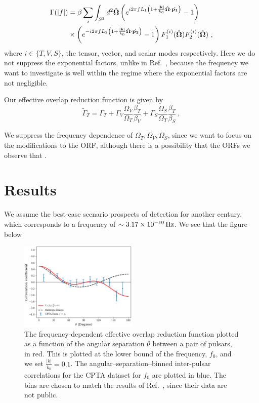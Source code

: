 \documentclass[prd,aps,psfig,nofootinbib,nobibnotes,superscriptaddress,preprintnumbers,times]{revtex4-2}\setlength{\topmargin}{-14mm}
\newcommand{\Hz}{\,{\rm Hz}}
\begin{document}
\begin{equation}
  \begin{aligned}\label{eq:orf_full}
    \Gamma(|f|) &= \beta \sum_i \int_{S^2} d^2 \hat{\bf{\Omega}} \left( e^{i2\pi f L_1\left(1 + \frac{|\bf k|}{k_0}\hat{\bf{\Omega}}\cdot \hat{\bf p_1} \right)} - 1\right) \\ &\times  \left( e^{-i2\pi f L_2\left(1 + \frac{|\bf k|}{k_0}\hat{\bf{\Omega}}\cdot \hat{\bf p_2} \right)} - 1\right) F_1^{(i)}(\hat{\bf{\Omega}}) F_2^{(i)}(\hat{\bf{\Omega}}) \ ,
  \end{aligned}\end{equation}
where $i \in \{T,V,S\}$, the tensor, vector, and scalar modes respectively. Here we do not suppress the exponential factors, unlike in Ref.\ \cite{Liang:2021bct}, because the frequency we want to investigate is well within the regime where the exponential factors are not negligible. 

Our effective overlap reduction function is given by \cite{Liang:2021bct}
\begin{equation}\label{eq:eff_orf}
    \tilde{\Gamma}_{T} = \Gamma_{T} + \Gamma_{V} \frac{\Omega_V}{\Omega_T}\frac{\beta_T}{\beta_V} + \Gamma_{S} \frac{\Omega_S}{\Omega_T}\frac{\beta_T}{\beta_S} \ ,
\end{equation}

We suppress the frequency dependence of $\Omega_T, \Omega_V, \Omega_S$, since we want to focus on the modifications to the ORF, although there is a possibility that the ORFs we observe that \cite{Xu:2023wog}. 
\section{Results}\label{sec:results}
We assume the best-case scenario prospects of detection for another century, which corresponds to a frequency of $\sim 3.17 \times 10^{-10} \Hz$. 
We see that the figure below
\begin{figure}[h]
    \centering
    \includegraphics[width=0.5\textwidth]{fig0.pdf}
    \caption{The frequency-dependent effective overlap reduction function plotted as a function of the angular separation $\theta$ between a pair of pulsars, in red. This is plotted at the lower bound of the frequency, $f_0$, and we set $\frac{|k|}{k_0} = 0.1$. The angular–separation–binned inter-pulsar correlations for the CPTA dataset for $f_0$ are plotted in blue. The bins are chosen to match the results of Ref.\ \cite{Xu:2023wog}, since their data are not public.}
    \label{fig:orf}
\end{figure}
\end{document}

